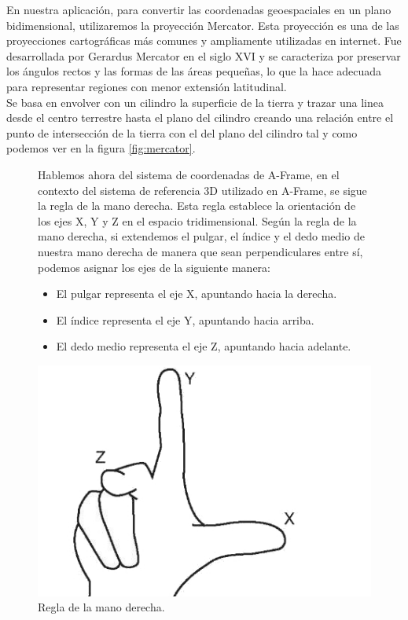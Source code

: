 \documentclass[a4paper, 11pt]{book}
\begin{document}
En nuestra aplicación, para convertir las coordenadas geoespaciales en un plano bidimensional, utilizaremos la proyección Mercator. Esta proyección es una de las proyecciones cartográficas más comunes y ampliamente utilizadas en internet. Fue desarrollada por Gerardus Mercator en el siglo XVI y se caracteriza por preservar los ángulos rectos y las formas de las áreas pequeñas, lo que la hace adecuada para representar regiones con menor extensión latitudinal.\\ 
Se basa en envolver con un cilindro la superficie de la tierra y trazar una linea desde el centro terrestre hasta el plano del cilindro creando una relación entre el punto de intersección de la tierra con el del plano del cilindro tal y como podemos ver en la figura \ref{fig:mercator}.
\begin{figure}[H]
\begin{minipage}{0.7\textwidth}
Hablemos ahora del sistema de coordenadas de A-Frame, en el contexto del sistema de referencia 3D utilizado en A-Frame, se sigue la regla de la mano derecha. Esta regla establece la orientación de los ejes X, Y y Z en el espacio tridimensional.
Según la regla de la mano derecha, si extendemos el pulgar, el índice y el dedo medio de nuestra mano derecha de manera que sean perpendiculares entre sí, podemos asignar los ejes de la siguiente manera:
\begin{itemize}
    \item El pulgar representa el eje X, apuntando hacia la derecha.
    \item El índice representa el eje Y, apuntando hacia arriba.
    \item El dedo medio representa el eje Z, apuntando hacia adelante.
    
\end{itemize}
\end{minipage}
\hfill
\begin{minipage}{0.25\textwidth}
\includegraphics[width=\textwidth]{img/rightHand.jpg}
\caption{Regla de la mano derecha.}
\label{fig:rightHand}
\end{minipage}
\end{figure}
\end{document}
